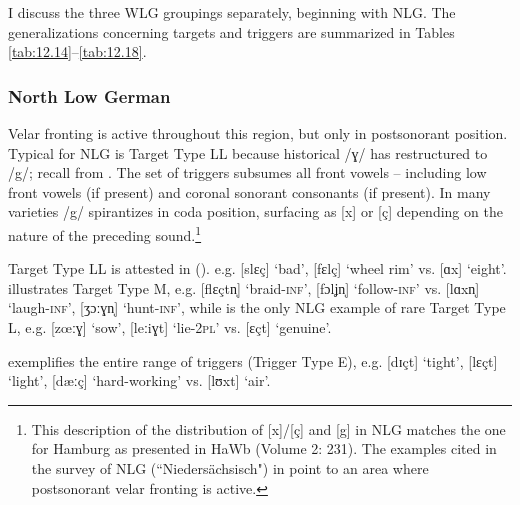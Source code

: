 I discuss the three WLG groupings separately, beginning with NLG. The generalizations concerning targets and triggers are summarized in Tables \ref{tab:12.14}--\ref{tab:12.18}.

\subsubsection{North Low German}
Velar fronting is active throughout this region, but only in postsonorant position. Typical for NLG is Target Type LL because historical /ɣ/ has restructured to /g/; recall  from . The set of triggers subsumes all front vowels -- including low front vowels (if present) and coronal sonorant consonants (if present). In many varieties /g/ spirantizes in coda position, surfacing as [x] or [ç] depending on the nature of the preceding sound.\footnote{{This description of the distribution of [x]/[ç] and [g] in NLG matches the one for Hamburg as presented in HaWb (Volume 2: 231). The examples cited in the survey of NLG (“Niedersächsisch") in \citet[37--38]{Stellmacher1981} point to an area where postsonorant velar fronting is active.} }

Target Type LL is attested in  ().  e.g. [slɛç] ‘bad’, [fɛlç] ‘wheel rim’ vs. [ɑx] ‘eight’.  illustrates Target Type M, e.g. [flɛçtn̩] ‘braid\textsc{{}-inf}’, [fɔlʝn̩] ‘follow\textsc{{}-inf}’ vs. [lɑxn̩] ‘laugh\textsc{{}-inf}’, [ʒɔːɣn̩] ‘hunt\textsc{{}-inf}’, while  is the only NLG example of rare Target Type L, e.g. [zœːɣ] ‘sow’, [leːiɣt] ‘lie\textsc{{}-2pl}’ vs. [ɛçt] ‘genuine’.

 exemplifies the entire range of triggers (Trigger Type E), e.g. [dɪçt] ‘tight’, [lɛçt] ‘light’, [dæːç] ‘hard-working’ vs. [lʊxt] ‘air’.

